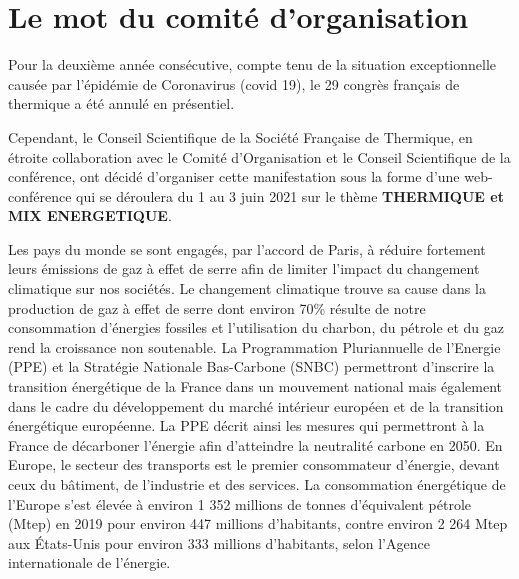 \chapter{Le mot du comité d'organisation}

Pour la deuxième année consécutive, compte tenu de la situation exceptionnelle causée par l'épidémie de Coronavirus (covid 19), le 29\ieme{} congrès français de thermique a été annulé en présentiel. 

Cependant, le Conseil Scientifique de la Société Française de Thermique, en étroite collaboration avec le Comité d'Organisation et le Conseil Scientifique de la conférence, ont décidé d'organiser cette manifestation sous la forme d'une web-conférence qui se déroulera du 1\ier{} au 3 juin 2021 sur le thème \textbf{THERMIQUE et MIX ENERGETIQUE}.

Les pays du monde se sont engagés, par l'accord de Paris, à réduire fortement leurs émissions de gaz à effet de serre afin de limiter l'impact du changement climatique sur nos sociétés. Le  changement climatique trouve sa cause dans la production de gaz à effet de serre dont environ 70\% résulte de notre consommation d'énergies fossiles et l'utilisation du charbon, du pétrole et du gaz rend la croissance non soutenable. La Programmation Pluriannuelle de l'Energie (PPE) et la Stratégie Nationale Bas-Carbone (SNBC)  permettront d'inscrire la transition énergétique de la France dans un mouvement national mais également dans le cadre du développement du marché intérieur européen et de la transition énergétique européenne. La PPE décrit ainsi les mesures qui permettront à la France de décarboner l'énergie afin d'atteindre la neutralité carbone en 2050. En Europe, le secteur des transports est le premier consommateur d'énergie, devant ceux du bâtiment, de l'industrie et des services. La consommation énergétique de l'Europe s'est élevée à environ 1 352 millions de tonnes d'équivalent pétrole (Mtep) en 2019 pour environ 447 millions d'habitants, contre environ 2 264 Mtep aux États-Unis pour environ 333 millions d'habitants, selon l'Agence internationale de l'énergie.


